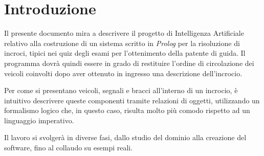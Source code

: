 \chapter{Introduzione}

Il presente documento mira a descrivere il progetto di Intelligenza Artificiale relativo alla costruzione di un sistema scritto in \emph{Prolog} per la risoluzione di incroci, tipici nei quiz degli esami per l'ottenimento della patente di guida. Il programma dovrà quindi essere in grado di restituire l'ordine di circolazione dei veicoli coinvolti dopo aver ottenuto in ingresso una descrizione dell'incrocio.

Per come si presentano veicoli, segnali e bracci all'interno di un incrocio, è intuitivo descrivere queste componenti tramite relazioni di oggetti, utilizzando un formalismo logico che, in questo caso, risulta molto più comodo rispetto ad un linguaggio imperativo. 

Il lavoro si svolgerà in diverse fasi, dallo studio del dominio alla creazione del software, fino al collaudo su esempi reali.
